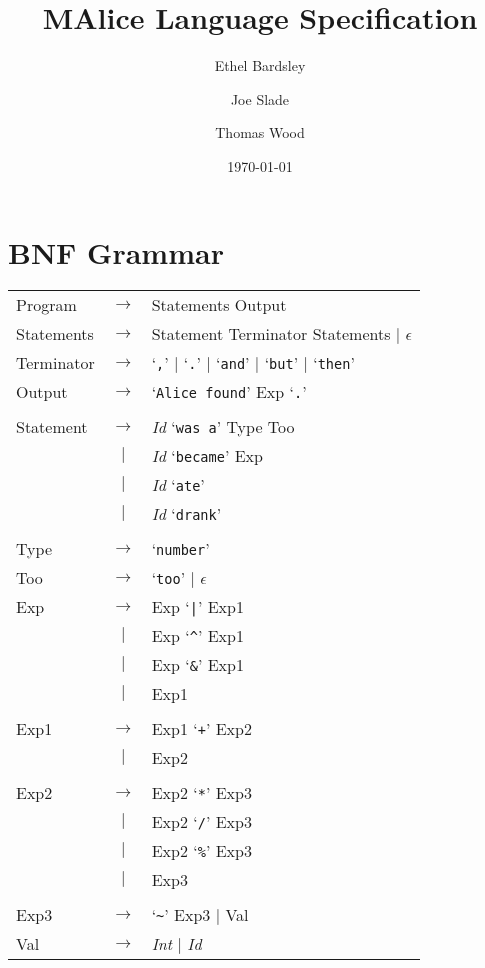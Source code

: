 \documentclass[a4wide, 11pt]{article}
\begin{document}
\title{MAlice Language Specification}

\author{Ethel Bardsley \and Joe Slade \and Thomas Wood}

\date{\today}         %

\maketitle            %

\section{BNF Grammar} 
\begin{tabular}{lcl}
Program     & $\to$ & Statements Output \\
Statements  & $\to$ & Statement Terminator Statements $|$ $\epsilon$ \\
Terminator  & $\to$ & `\verb:,:' $|$ `\verb:.:' $|$ `\verb:and:' $|$ `\verb:but:' $|$ `\verb:then:' \\
Output      & $\to$ & `\verb:Alice found:' Exp `\verb:.:' \\
\\
Statement   & $\to$ & \emph{Id} `\verb|was a|' Type Too \\
            &  $|$  & \emph{Id} `\verb|became|' Exp \\
            &  $|$  & \emph{Id} `\verb|ate|' \\
            &  $|$  & \emph{Id} `\verb|drank|' \\
\\
Type        & $\to$ & `\verb|number|' \\
Too         & $\to$ & `\verb|too|' $|$ $\epsilon$ \\
Exp         & $\to$ & Exp `\verb:|:' Exp1 \\
            &  $|$  & Exp `\verb:^:' Exp1 \\
            &  $|$  & Exp `\verb:&:' Exp1 \\
            &  $|$  & Exp1 \\
\\
Exp1        & $\to$ & Exp1 `\verb:+:' Exp2 \\
            &  $|$  & Exp2 \\
\\
Exp2        & $\to$ & Exp2 `\verb:*:' Exp3 \\
            &  $|$  & Exp2 `\verb:/:' Exp3 \\
            &  $|$  & Exp2 `\verb:%:' Exp3 \\
            &  $|$  & Exp3 \\
\\
Exp3        & $\to$ & `\verb:~:' Exp3 $|$ Val \\
Val         & $\to$ & \emph{Int} $|$ \emph{Id} \\
\end{tabular}
\end{document}

